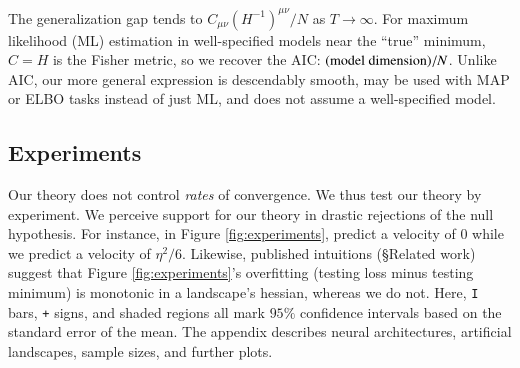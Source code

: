            The generalization gap tends  
            to $C_{\mu\nu}(H^{-1})^{\mu\nu}/N$ as $T\to\infty$.  For maximum
            likelihood (ML) estimation in well-specified models near the ``true''
            minimum, $C=H$ is the Fisher metric, so we recover the AIC:
            $(\textnormal{model dimension})/N$.  Unlike AIC, our more general
            expression is descendably smooth, may be used with MAP or ELBO tasks
            instead of just ML, and does not assume a well-specified model.

    \subsection{Experiments}
        Our theory does not control \emph{rates} of convergence. 
        We thus test our theory by experiment.  We perceive support for our
        theory in drastic rejections of the null hypothesis.  For instance, in
        Figure \ref{fig:experiments}, \cite{ch18} predict a velocity of
        $0$ while we predict a velocity of $\eta^2/6$.  Likewise, published
        intuitions (\S Related work) suggest that Figure
        \ref{fig:experiments}'s overfitting (testing loss minus testing
        minimum) is monotonic in a landscape's hessian, whereas we do not.
        Here, \texttt{I} bars, \texttt{+} signs, and shaded regions all mark
        $95\%$ confidence intervals based on the standard error of the mean.
        The appendix describes neural architectures, artificial
        landscapes, sample sizes, and further plots.


